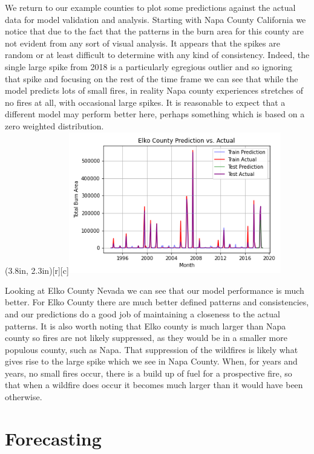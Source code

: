 \documentclass[12pt]{article}
\begin{document}
We return to our example counties to plot some predictions against the actual data for model validation and analysis. Starting with Napa County California we notice that due to the fact that the patterns in the burn area for this county are not evident from any sort of visual analysis. It appears that the spikes are random or at least difficult to determine with any kind of consistency. Indeed, the single large spike from 2018 is a particularly egregious outlier and so ignoring that spike and focusing on the rest of the time frame we can see that while the model predicts lots of small fires, in reality Napa county experiences stretches of no fires at all, with occasional large spikes. It is reasonable to expect that a different model may perform better here, perhaps something which is based on a zero weighted distribution. \\

\parpic(3.8in, 2.3in)[r][c]{\includegraphics[width=3.65in]{./img/ElkoPredPlot.png}}

Looking at Elko County Nevada we can see that our model performance is much better. For Elko County there are much better defined patterns and consistencies, and our predictions do a good job of maintaining a closeness to the actual patterns. It is also worth noting that Elko county is much larger than Napa county so fires are not likely suppressed, as they would be in a smaller more populous county, such as Napa. That suppression of the wildfires is likely what gives rise to the large spike which we see in Napa County. When, for years and years, no small fires occur, there is a build up of fuel for a prospective fire, so that when a wildfire does occur it becomes much larger than it would have been otherwise. \\

\section{\textrm{Forecasting}}
\end{document}
